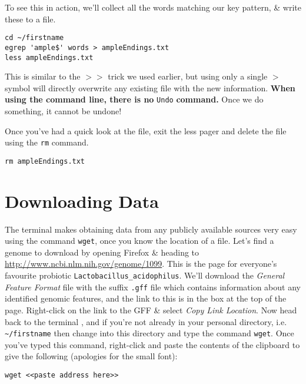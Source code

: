 \begin{steps}
To see this in action, we'll collect all the words matching our key pattern, \& write these to a file.
\end{steps}
\begin{lstlisting}
cd ~/firstname
egrep 'ample$' words > ampleEndings.txt
less ampleEndings.txt
\end{lstlisting}

\begin{information}
This is similar to the $>>$ trick we used earlier, but using only a single $>$ symbol will directly overwrite any existing file with the new information.
\textbf{When using the command line, there is no }\texttt{Undo} \textbf{command.}
Once we do something, it cannot be undone!
\end{information}

Once you've had a quick look at the file, exit the less pager and delete the file using the \texttt{rm} command.
\begin{lstlisting}
rm ampleEndings.txt
\end{lstlisting}

\section{Downloading Data}

\begin{steps}
The terminal makes obtaining data from any publicly available sources very easy using the command \texttt{wget}, once you know the location of a file.
Let's find a genome to download by opening Firefox \& heading to \url{http://www.ncbi.nlm.nih.gov/genome/1099}.
This is the page for everyone's favourite probiotic \texttt{Lactobacillus\_acidophilus}.
We'll download the \textit{General Feature Format} file with the suffix \texttt{.gff} file which contains information about any identified genomic features, and the link to this is in the box at the top of the page.
Right-click on the link to the GFF \& select \textit{Copy Link Location}.
Now head back to the terminal , and if you're not already in your personal directory, i.e. \texttt{\~{}/firstname} then change into this directory and type the command \texttt{wget}.
Once you've typed this command, right-click and paste the contents of the clipboard to give the following (apologies for the small font):
\end{steps}

\begin{lstlisting}
wget <<paste address here>>
\end{lstlisting}

